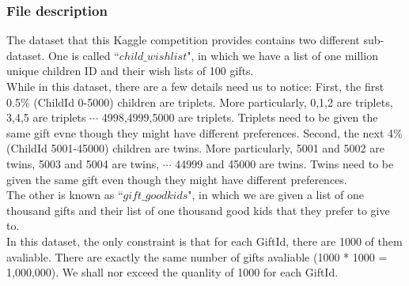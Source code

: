 \documentclass[12pt]{article}
\begin{document}
\subsubsection{File description}
The dataset that this Kaggle competition provides contains two different sub-dataset.
One is called ``$child\_wishlist$", in which we have a list of one million unique children ID and their wish lists of 100 gifts. \\
While in this dataset, there are a few details need us to notice: First, the first 0.5\% (ChildId 0-5000) children are triplets. More particularly, 0,1,2 are triplets, 3,4,5 are triplets $\cdots$ 4998,4999,5000 are triplets. Triplets need to be given the same gift evne though they might have different preferences. Second, the next 4\% (ChildId 5001-45000) children are twins. More particularly, 5001 and 5002 are twins, 5003 and 5004 are twins, $\cdots$ 44999 and 45000 are twins. Twins need to be given the same gift even though they might have different preferences.\\
The other is known as ``$gift\_goodkids$", in which we are given a list of one thousand gifts and their list of one thousand good kids that they prefer to give to.\\
In this dataset, the only constraint is that for each GiftId, there are 1000 of them avaliable. There are exactly the same number of gifts avaliable (1000 * 1000 = 1,000,000). We shall nor exceed the quanlity of 1000 for each GiftId.
\end{document}
